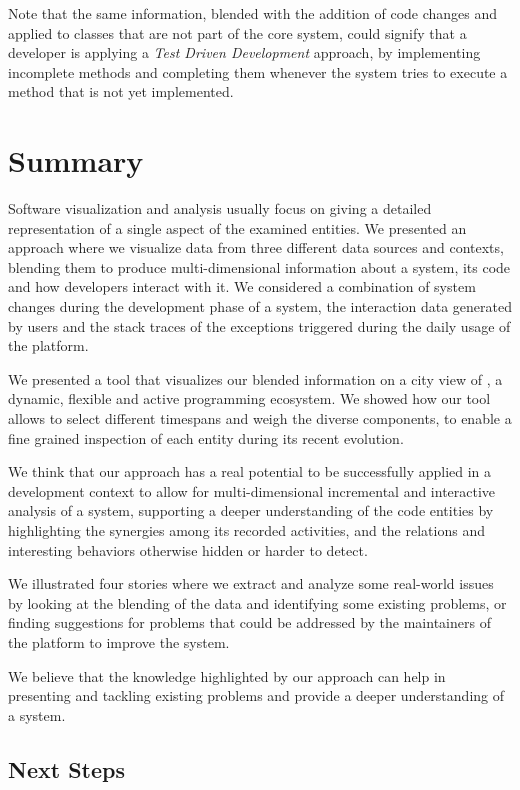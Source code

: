 Note that the same information, blended with the addition of code changes and applied to classes that are not part of the core system, could signify that a developer is applying a \textit{Test Driven Development} approach, by implementing incomplete methods and completing them whenever the system tries to execute a method that is not yet implemented.



\section{Summary}\label{sec:blend-summary}

Software visualization and analysis usually focus on giving a detailed representation of a single aspect of the examined entities.
We presented an approach where we visualize data from three different data sources and contexts, blending them to produce multi-dimensional information about a system, its code and how developers interact with it.
We considered a combination of system changes during the development phase of a system, the interaction data generated by users and the stack traces of the exceptions triggered during the daily usage of the platform.

We presented a tool that visualizes our blended information on a city view of \pha, a dynamic, flexible and active programming ecosystem.
We showed how our tool allows to select different timespans and weigh the diverse components, to enable a fine grained inspection of each entity during its recent evolution.

We think that our approach has a real potential to be successfully applied in a development context to allow for multi-dimensional incremental and interactive analysis of a system, supporting a deeper understanding of the code entities by highlighting the synergies among its recorded activities, and the relations and interesting behaviors otherwise hidden or harder to detect.

We illustrated four stories where we extract and analyze some real-world issues by looking at the blending of the data and identifying some existing problems, or finding suggestions for problems that could be addressed by the maintainers of the platform to improve the system.

We believe that the knowledge highlighted by our approach can help in presenting and tackling existing problems and provide a deeper understanding of a system.

\subsection{Next Steps}

